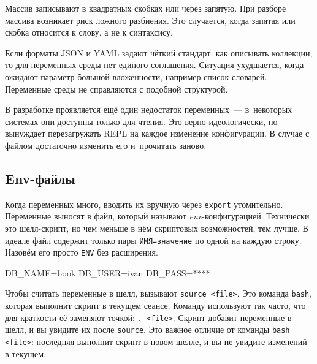 \fi


Массив записывают в квадратных скобках или через запятую. При разборе массива
возникает риск ложного разбиения. Это случается, когда запятая или скобка
относится к слову, а не к синтаксису.


Если форматы JSON и YAML задают чёткий стандарт, как описывать коллекции, то для
переменных среды нет единого соглашения. Ситуация ухудшается, когда ожидают
параметр большой вложенности, например список словарей. Переменные среды не
справляются с подобной структурой.

В разработке проявляется ещё один недостаток переменных~--- в~некоторых системах
они доступны только для чтения. Это верно идеологически, но вынуждает
перезагружать REPL на каждое изменение конфигурации. В случае с файлом
достаточно изменить его и~прочитать заново.

\subsection{Env-файлы}


Когда переменных много, вводить их вручную через \verb|export|
утомительно. Переменные выносят в файл, который называют
\emph{env}-кон\-фи\-гу\-ра\-цией. Технически это шелл-скрипт, но чем меньше в
нём скриптовых возможностей, тем лучше. В идеале файл содержит только пары
\verb|ИМЯ=значение| по одной на каждую строку. Назовём его просто \verb|ENV| без
расширения.

\begin{english}
  \begin{bash}
DB_NAME=book
DB_USER=ivan
DB_PASS=****
  \end{bash}
\end{english}

Чтобы считать переменные в шелл, вызывают \verb|source <file>|. Это команда
\verb|bash|, которая выполнит скрипт в текущем сеансе. Команду используют так
часто, что для краткости её заменяют точкой: \verb|. <file>|. Скрипт добавит
переменные в шелл, и вы увидите их после \verb|source|. Это важное отличие от
команды \verb|bash <file>|: последняя выполнит скрипт в новом шелле, и вы не
увидите изменений в текущем.

\begin{english}
\end{english}

